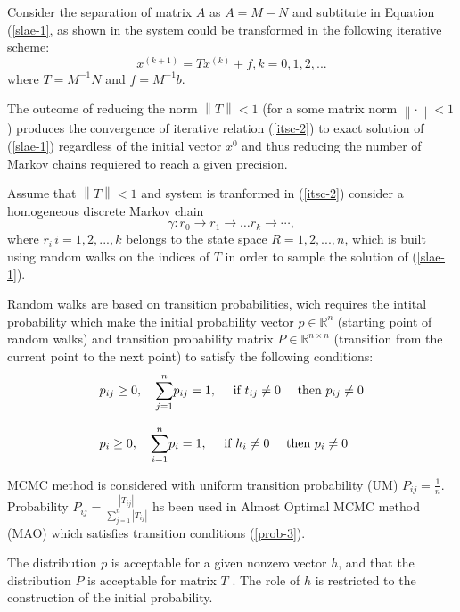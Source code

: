 \documentclass{juliacon}
\begin{document}
Consider the separation of matrix $A$ as $A =  M - N$ and subtitute in Equation (\ref{slae-1}, as shown in \cite{Fathi2002mixedmc} the system could be transformed in the following iterative scheme: 
\begin{equation}
\label{itsc-2}
x^{(k+1)} = Tx^{(k)}+f, k = 0,1,2,... 
\end{equation}
where $T = M^{-1}N$ and $f = M^{-1}b$.

The outcome of reducing the norm $\left \| T \right \| < 1$ (for a some matrix norm $\left \| \cdot \right \| < 1$) produces the convergence of iterative relation (\ref{itsc-2}) to exact solution of (\ref{slae-1}) regardless of the initial vector $x^0$ and thus reducing the number of Markov chains requiered to reach a given precision.

Assume that $\left \| T \right \| < 1$ and system is tranformed in (\ref{itsc-2}) consider a homogeneous discrete Markov chain $$\gamma : r_0 \rightarrow r_1 \rightarrow \dots r_k \rightarrow \cdots , $$ where $r_i\, i = 1,2,...,k$ belongs to the state space $R={1,2,...,n}$, which is built using random walks on the indices of $T$ in order to sample the solution of (\ref{slae-1}). 

Random walks are based on transition probabilities, wich requires the intital probability which make the initial probability vector $p \in \mathbb{R}^n$ (starting point of random walks) and transition probability matrix  $P \in \mathbb{R}^{n\times n}$ (transition from the current point to the next point) to satisfy the following conditions: 
\begin{equation}
\label{prob-3}
 \begin{array}{l}
 p_{ij} \geq 0, \quad \mathlarger{\sum}_{j=1}^{n} p_{i j}=1, \quad \text { if  } t_{ij} \neq 0 \quad \text { then  } p_{i j} \neq 0 \\ \\ p_i \geq 0, \quad \mathlarger{\sum}_{i=1}^{n} p_{i}=1, \quad \text { if  } h_{i} \neq 0 \quad \text { then } p_{i} \neq 0
 \end{array} 
\end{equation}

MCMC method is considered with uniform transition probability (UM) $P_{ij} = \frac{1}{n}$. Probability $P_{ij} = \frac{| T_{ij} |}{\sum_{j=1}^n | T_{ij} |}$ hs been used in Almost Optimal MCMC method (MAO) which satisfies transition conditions (\ref{prob-3}).

The distribution $p$ is acceptable for a given nonzero vector $h$, and that the distribution $P$ is acceptable for matrix $T$ \cite{branford2005}. The role of $h$ is restricted to the construction of the initial probability.
\end{document}
